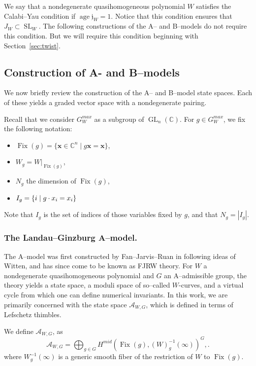 \documentclass[10pt, letterpaper]{amsart}
\theoremstyle{remark}
\newcommand{\CC}{\mathbb C}
\newcommand{\sA}{\mathscr{A}}
\newcommand{\jw}{\mathfrak{j}}
\newcommand{\set}[1]{\{#1\}}
\newcommand{\mb}[1]{\mathbf{#1}}
\DeclareMathOperator{\SL}{SL}
\DeclareMathOperator{\GL}{GL}
\DeclareMathOperator{\Fix}{Fix}
\DeclareMathOperator{\age}{age}
\begin{document}
We say that a nondegenerate quasihomogeneous polynomial $W$ satisfies the Calabi--Yau condition if $\age \jw_W=1$. Notice that this condition ensures that $J_W\subset \SL_W$. The following constructions of the A-- and B--models do not require this condition. But we will require this condition beginning with Section~\ref{sec:twist}. 


\subsection{Construction of A- and B--models}
We now briefly review the construction of the A-- and B--model state spaces. Each of these yields a graded vector space with a nondegenerate pairing.

Recall that we consider $G^{max}_W$ as a subgroup of $\GL_n(\CC)$. For $g\in G^{max}_W$, we fix the following notation:
\begin{itemize}
\item $\Fix(g)=\set{ \mb{x}\in \CC^n\mid g\mb{x}=\mb{x}}$, 
\item $W_g=W|_{\Fix(g)}$, 
\item $N_g$ the dimension of $\Fix(g)$,
\item $I_g = \{i \hspace{.1cm} |\hspace{.1cm}  g \cdot x_i = x_i\}$ 
\end{itemize}
Note that $I_g$ is the set of indices of those variables fixed by $g$, and that $N_g=|I_g|$.
\subsubsection*{The Landau--Ginzburg A--model.} The A--model was first constructed by Fan--Jarvis--Ruan in \cite{FJR13} following ideas of Witten, and has since come to be known as FJRW theory. For $W$ a nondegenerate quasihomogeneous polynomial and $G$ an A--admissible group, the theory yields a state space, a moduli space of so--called $W$-curves, and a virtual cycle from which one can define numerical invariants. In this work, we are primarily concerned with the state space $\sA_{W,G}$, which is defined in terms of Lefschetz thimbles.

We define $\sA_{W,G}$, as %
\begin{equation}\label{e:Aspace}
\sA_{W,G} = \bigoplus_{g \in G} H^{mid} (\Fix(g),(W)_g^{-1}( \infty))^G,.
\end{equation}
where $W_g^{-1}(\infty)$ is a generic smooth fiber of the restriction of $W$ to $\Fix(g)$.
\end{document}
